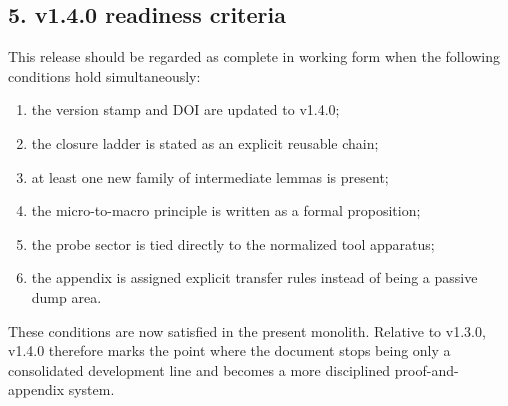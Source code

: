 \subsection*{5. v1.4.0 readiness criteria}
This release should be regarded as complete in working form when the following
conditions hold simultaneously:
\begin{enumerate}[leftmargin=2em]
  \item the version stamp and DOI are updated to v1.4.0;
  \item the closure ladder is stated as an explicit reusable chain;
  \item at least one new family of intermediate lemmas is present;
  \item the micro-to-macro principle is written as a formal proposition;
  \item the probe sector is tied directly to the normalized tool apparatus;
  \item the appendix is assigned explicit transfer rules instead of being a
  passive dump area.
\end{enumerate}

These conditions are now satisfied in the present monolith. Relative to v1.3.0,
v1.4.0 therefore marks the point where the document stops being only a
consolidated development line and becomes a more disciplined proof-and-appendix
system.


